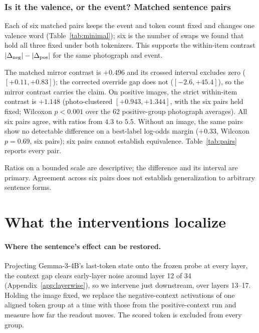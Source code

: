 \documentclass{article}
\newif\ifshort
\newcommand{\gemma}{Gemma-3-4B}
\begin{document}
\subsubsection{Is it the valence, or the event? Matched sentence pairs}
\label{sec:minimal}

Each of six matched pairs keeps the event and token count fixed and changes one valence word (Table~\ref{tab:minimal}); six is the number of swaps we found that hold all three fixed under both tokenizers. This supports the within-item contrast $|\Delta_{\rm neg}|-|\Delta_{\rm pos}|$ for the same photograph and event.



The matched mirror contrast is $+0.496$ and its crossed interval excludes zero ($[+0.11,+0.83]$); the corrected override gap does not ($[-2.6,+45.4]$), so the mirror contrast carries the claim. On positive images, the strict within-item contrast is $+1.148$ (photo-clustered $[+0.943,+1.344]$, with the six pairs held fixed; Wilcoxon $p<0.001$ over the 62 positive-group photograph averages). All six pairs agree, with ratios from $4.3$ to $5.5$. Without an image, the same pairs show no detectable difference on a best-label log-odds margin ($+0.33$, Wilcoxon $p=0.69$, six pairs); six pairs cannot establish equivalence. Table~\ref{tab:pairs} reports every pair.


Ratios on a bounded scale are descriptive; the difference and its interval are primary. Agreement across six pairs does not establish generalization to arbitrary sentence forms.
\fi

\ifshort
\section{What the interventions localize}
\label{sec:mechanism}

\label{sec:patching}
\label{sec:crosspatch}

\paragraph{Where the sentence's effect can be restored.}
Projecting \gemma{}'s last-token state onto the frozen probe at every layer, the context gap clears early-layer noise around layer 12 of 34 (Appendix~\ref{app:layerwise}), so we intervene just downstream, over layers 13--17. Holding the image fixed, we replace the negative-context activations of one aligned token group at a time with those from the positive-context run and measure how far the readout moves. The scored token is excluded from every group.
\end{document}
